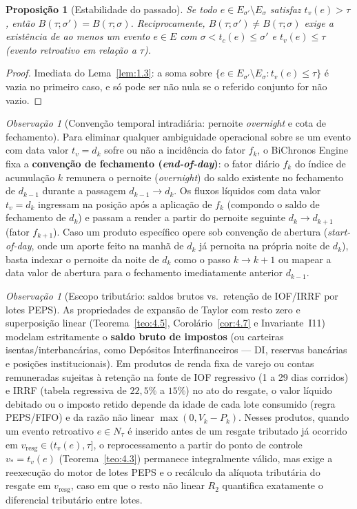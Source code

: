 \documentclass[11pt, a4paper]{article}
\theoremstyle{definition}
\theoremstyle{plain}
\newtheorem{proposicao}[definicao]{Proposição}
\theoremstyle{remark}
\newtheorem{observacao}[definicao]{Observação}
\begin{document}
\begin{proposicao}[Estabilidade do passado]\label{prop:1.4}
Se todo $e \in E_{\sigma'} \setminus E_\sigma$ satisfaz $t_v(e) > \tau$, então $B(\tau; \sigma') = B(\tau; \sigma)$. Reciprocamente, $B(\tau; \sigma') \neq B(\tau; \sigma)$ exige a existência de ao menos um evento $e \in E$ com $\sigma < t_c(e) \le \sigma'$ e $t_v(e) \le \tau$ (evento retroativo em relação a $\tau$).
\end{proposicao}
\begin{proof}
Imediata do Lema~\ref{lem:1.3}: a soma sobre $\{e \in E_{\sigma'} \setminus E_\sigma : t_v(e) \le \tau\}$ é vazia no primeiro caso, e só pode ser não nula se o referido conjunto for não vazio.
\end{proof}

\begin{observacao}[Convenção temporal intradiária: pernoite \emph{overnight} e cota de fechamento]\label{obs:1.5}
Para eliminar qualquer ambiguidade operacional sobre se um evento com data valor $t_v = d_k$ sofre ou não a incidência do fator $f_k$, o BiChronos Engine fixa a \textbf{convenção de fechamento (\emph{end-of-day})}: o fator diário $f_k$ do índice de acumulação $k$ remunera o pernoite (\emph{overnight}) do saldo existente no fechamento de $d_{k-1}$ durante a passagem $d_{k-1} \to d_k$. Os fluxos líquidos com data valor $t_v = d_k$ ingressam na posição após a aplicação de $f_k$ (compondo o saldo de fechamento de $d_k$) e passam a render a partir do pernoite seguinte $d_k \to d_{k+1}$ (fator $f_{k+1}$). Caso um produto específico opere sob convenção de abertura (\emph{start-of-day}, onde um aporte feito na manhã de $d_k$ já pernoita na própria noite de $d_k$), basta indexar o pernoite da noite de $d_k$ como o passo $k \to k+1$ ou mapear a data valor de abertura para o fechamento imediatamente anterior $d_{k-1}$.
\end{observacao}

\begin{observacao}[Escopo tributário: saldos brutos vs.\ retenção de IOF/IRRF por lotes PEPS]\label{obs:1.6}
As propriedades de expansão de Taylor com resto zero e superposição linear (Teorema~\ref{teo:4.5}, Corolário~\ref{cor:4.7} e Invariante~I11) modelam estritamente o \textbf{saldo bruto de impostos} (ou carteiras isentas/interbancárias, como Depósitos Interfinanceiros --- DI, reservas bancárias e posições institucionais). Em produtos de renda fixa de varejo ou contas remuneradas sujeitas à retenção na fonte de IOF regressivo (1 a 29 dias corridos) e IRRF (tabela regressiva de $22{,}5\%$ a $15\%$) no ato do resgate, o valor líquido debitado ou o imposto retido depende da idade de cada lote consumido (regra PEPS/FIFO) e da razão não linear $\max(0, V_k - P_k)$. Nesses produtos, quando um evento retroativo $e \in N_\tau$ é inserido antes de um resgate tributado já ocorrido em $v_{\text{resg}} \in (t_v(e), \tau]$, o reprocessamento a partir do ponto de controle $v_* = t_v(e)$ (Teorema~\ref{teo:4.3}) permanece integralmente válido, mas exige a reexecução do motor de lotes PEPS e o recálculo da alíquota tributária do resgate em $v_{\text{resg}}$, caso em que o resto não linear $R_2$ quantifica exatamente o diferencial tributário entre lotes.
\end{observacao}
\end{document}
